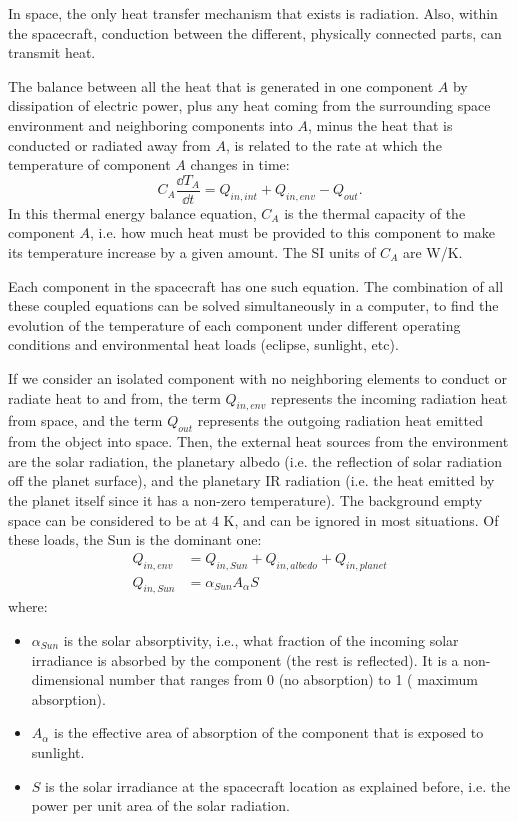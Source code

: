 In space, the only heat transfer mechanism that exists is radiation. Also,
within the spacecraft, conduction between the different, physically connected
parts, can transmit heat.

The balance between all the heat that is generated in one component $A$ by
dissipation of electric power, plus any heat coming from the surrounding space
environment and neighboring components into $A$, minus the heat that is
conducted or radiated away from $A$, is related to the rate at which the temperature of component $A$ changes in time:
%
\begin{equation}
C_A \frac{\dd T_A}{\dd t} = Q_{in,int} + 
Q_{in,env} - Q_{out}.
\end{equation}
%
In this thermal energy balance equation, $C_A$ is the thermal capacity of
the component $A$, i.e. how much heat must be provided to this component to 
make its temperature increase by a given amount. The SI units of $C_A$ are 
W/K.

Each component in the spacecraft has one such equation. The combination of all
these coupled equations can be solved simultaneously in a computer, to find the
evolution of the temperature of each component under different operating
conditions and environmental heat loads (eclipse, sunlight, etc).

If we consider an isolated component with no neighboring elements to conduct
or radiate heat to and from, the term $Q_{in,env}$ represents the
incoming  radiation heat from space, and the term $Q_{out}$ represents the
outgoing radiation heat emitted from the object into space. Then, the external
heat sources from the environment are the solar radiation, the planetary
albedo (i.e. the reflection of solar radiation off the planet surface), and
the planetary IR radiation (i.e. the heat emitted by the planet itself since
it has a non-zero temperature). The background empty space can be considered 
to be at $4$ K, and can be ignored in most situations.
Of these loads, the Sun is the dominant one:
%
\begin{align}
Q_{in,env} &= Q_{in,Sun} + Q_{in,albedo} + Q_{in,planet}
\\
Q_{in,Sun} &= \alpha_{Sun} A_\alpha S
\end{align}
%
where: 
%
\begin{itemize}
\item $\alpha_{Sun}$ is the solar absorptivity, i.e., what fraction of the 
incoming solar irradiance is absorbed by the component (the rest is reflected).
It is a non-dimensional number that ranges from 0 (no absorption) to 1 (
maximum absorption).
\item $A_\alpha$ is the effective area of absorption of the component that is 
exposed to sunlight.
\item $S$ is the solar irradiance at the spacecraft location as explained 
before, i.e. the power per unit area of the solar radiation. 
\end{itemize}
%

